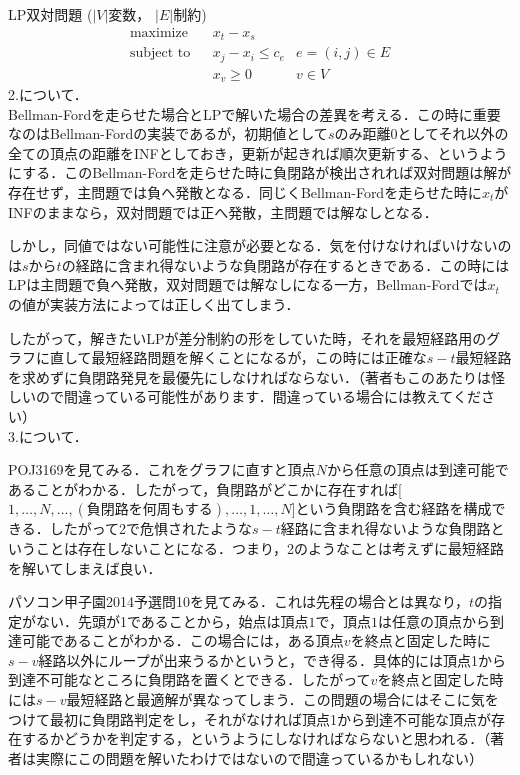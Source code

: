 \documentclass[13pt, a4paper, landscape]{jarticle}
\theoremstyle{nonitalic} %
\begin{document}
LP双対問題
($|V|$変数， $|E|$制約)
\begin{align}
 &&&&&\textrm{maximize}   && x_t - x_s \\
 &&&&&\textrm{subject to} && x_j - x_i\leq c_e & e = (i,j) \in E  &&&&&\\
 &&&&&                    && x_v \geq 0 & v \in V &&&&&
\end{align}
2.について．\\
 Bellman-Fordを走らせた場合とLPで解いた場合の差異を考える．この時に重要なのはBellman-Fordの実装であるが，初期値として$s$のみ距離0としてそれ以外の全ての頂点の距離をINFとしておき，更新が起きれば順次更新する、というようにする．このBellman-Fordを走らせた時に負閉路が検出されれば双対問題は解が存在せず，主問題では負へ発散となる．同じくBellman-Fordを走らせた時に$x_t$がINFのままなら，双対問題では正へ発散，主問題では解なしとなる．

しかし，同値ではない可能性に注意が必要となる．気を付けなければいけないのは$s$から$t$の経路に含まれ得ないような負閉路が存在するときである．この時にはLPは主問題で負へ発散，双対問題では解なしになる一方，Bellman-Fordでは$x_t$の値が実装方法によっては正しく出てしまう．

したがって，解きたいLPが差分制約の形をしていた時，それを最短経路用のグラフに直して最短経路問題を解くことになるが，この時には正確な$s-t$最短経路を求めずに負閉路発見を最優先にしなければならない．（著者もこのあたりは怪しいので間違っている可能性があります．間違っている場合には教えてください）\\

3.について．

POJ3169を見てみる．これをグラフに直すと頂点$N$から任意の頂点は到達可能であることがわかる．したがって，負閉路がどこかに存在すれば[$1, \dots ,N,\dots, ( \textrm{負閉路を何周もする} ),\dots ,1, \dots, N$]という負閉路を含む経路を構成できる．したがって2で危惧されたような$s-t$経路に含まれ得ないような負閉路ということは存在しないことになる．つまり，2のようなことは考えずに最短経路を解いてしまえば良い．

パソコン甲子園2014予選問10を見てみる．これは先程の場合とは異なり，$t$の指定がない．先頭が1であることから，始点は頂点$1$で，頂点$1$は任意の頂点から到達可能であることがわかる．この場合には，ある頂点$v$を終点と固定した時に$s-v$経路以外にループが出来うるかというと，でき得る．具体的には頂点1から到達不可能なところに負閉路を置くとできる．したがって$v$を終点と固定した時には$s-v$最短経路と最適解が異なってしまう．この問題の場合にはそこに気をつけて最初に負閉路判定をし，それがなければ頂点1から到達不可能な頂点が存在するかどうかを判定する，というようにしなければならないと思われる．（著者は実際にこの問題を解いたわけではないので間違っているかもしれない）
\end{document}

